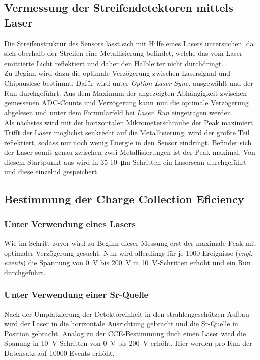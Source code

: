 \FloatBarrier
\subsection{Vermessung der Streifendetektoren mittels Laser}
\label{sec:Vermessung_Laser}
Die Streifenstruktur des Sensors lässt sich mit Hilfe eines Lasers untersuchen, da sich oberhalb der Streifen eine Metallisierung befindet, welche das vom Laser emittierte Licht reflektiert und daher den Halbleiter nicht durchdringt.\\
Zu Beginn wird dazu die optimale Verzögerung zwischen Lasersignal und Chipauslese bestimmt. Dafür wird unter \textit{Option} \textit{Laser Sync.} ausgewählt und der Run durchgeführt. Aus dem Maximum der angezeigten Abhängigkeit zwischen gemessenen ADC-Counts und Verzögerung kann nun die optimale Verzögerung abgelesen und unter dem Formularfeld bei \textit{Laser Run} eingetragen werden.\\
Als nächstes wird mit der horizontalen Mikrometerschraube der Peak maximiert. Trifft der Laser möglichst senkrecht auf die Metallisierung, wird der größte Teil reflektiert, sodass nur noch wenig Energie in den Sensor eindringt. Befindet sich der Laser somit genau zwischen zwei Metallisierungen ist der Peak maximal. Von diesem Startpunkt aus wird in \num{35} \SI{10}{\micro\meter}-Schritten ein Laserscan durchgeführt und diese einzelnd gespeichert.


\subsection{Bestimmung der Charge Collection Eficiency}
\label{sec:CCE}
\subsubsection{Unter Verwendung eines Lasers}
Wie im Schritt zuvor wird zu Beginn dieser Messung erst der maximale Peak mit optimaler Verzögerung gesucht. Nun wird allerdings für je \num{1000} Ereignisse (\textit{engl. events}) die Spannung von \SI{0}{\volt} bis \SI{200}{\volt} in \SI{10}{\volt}-Schritten erhöht und ein Run durchgeführt.

\subsubsection{Unter Verwendung einer Sr-Quelle}
Nach der Umplatzierung der Detektoreinheit in den strahlengeschützen Aufbau wird der Laser in die horizontale Ausrichtung gebracht und die Sr-Quelle in Position gebracht. Analog zu der CCE-Bestimmung duch einen Laser wird die Spanung in \SI{10}{\volt}-Schritten von \SI{0}{\volt} bis \SI{200}{\volt} erhöht. Hier werden pro Run der Datensatz auf \num{10000} Events erhöht.

